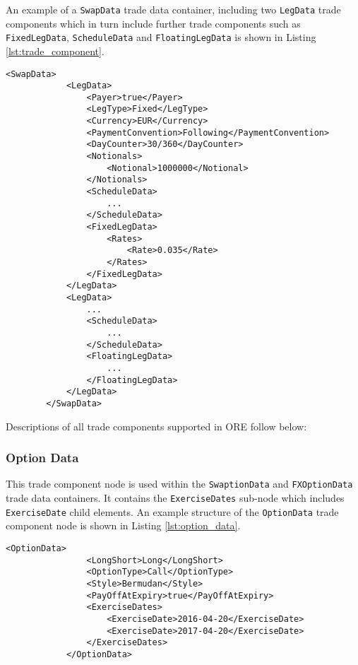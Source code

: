 \vspace{1em}

An example of a \lstinline!SwapData! trade data container, including two \lstinline!LegData! trade components which in turn include further trade components such as \lstinline!FixedLegData!, \lstinline!ScheduleData! and \lstinline!FloatingLegData! is shown in Listing \ref{lst:trade_component}.

{\footnotesize
\begin{lstlisting}[caption=Trade Components Example, label=lst:trade_component]
        <SwapData>
            <LegData>
                <Payer>true</Payer>
                <LegType>Fixed</LegType>
                <Currency>EUR</Currency>
                <PaymentConvention>Following</PaymentConvention>
                <DayCounter>30/360</DayCounter>
                <Notionals>
                    <Notional>1000000</Notional>
                </Notionals>
                <ScheduleData>
                	...
                </ScheduleData>
                <FixedLegData>
                    <Rates>
                        <Rate>0.035</Rate>
                    </Rates>
                </FixedLegData>
            </LegData>
            <LegData>
            	...
                <ScheduleData>
                	...
                </ScheduleData>
                <FloatingLegData>
                	...
                </FloatingLegData>
            </LegData>
        </SwapData>
 \end{lstlisting}
}

Descriptions of all trade components supported in ORE follow below:

\subsubsection{Option Data}
\label{ss:option_data} 
This trade component node is used within the \lstinline!SwaptionData! and \lstinline!FXOptionData! trade data containers. It contains the \lstinline!ExerciseDates! sub-node which includes  \lstinline!ExerciseDate! child elements. An example structure of the \lstinline!OptionData! trade component node is shown in Listing \ref{lst:option_data}.

{\footnotesize
\begin{lstlisting}[caption=OptionData, label=lst:option_data]
            <OptionData>
                <LongShort>Long</LongShort>
                <OptionType>Call</OptionType>
                <Style>Bermudan</Style>
                <PayOffAtExpiry>true</PayOffAtExpiry>
                <ExerciseDates>
                    <ExerciseDate>2016-04-20</ExerciseDate>
                    <ExerciseDate>2017-04-20</ExerciseDate>
                </ExerciseDates>
            </OptionData>
\end{lstlisting}
}

